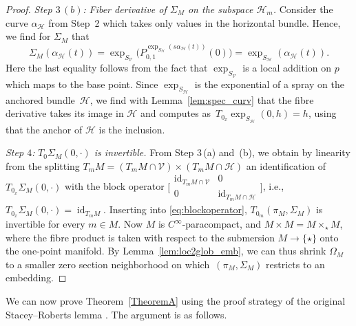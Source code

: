 \documentclass[pdftex]{sigma}
\numberwithin{equation}{section}
\newcommand{\cH}{\ensuremath{\mathcal{H}}}
\newcommand{\cV}{\ensuremath{\mathcal{V}}}
\DeclareMathOperator{\id}{id}
\begin{document}
\begin{proof}
{\it Step $3\,(b)$:} \emph{Fiber derivative of $\Sigma_M$ on the subspace $\cH_m$.} Consider the curve $\alpha_\cH$ from Step~2 which takes only values in the horizontal bundle. Hence, we find for $\Sigma_M$ that
\begin{displaymath}\Sigma_M (\alpha_{\cH}(t)) =\exp_{S_{\cV}}\bigl(P_{0,1}^{\exp_{S_\cH}(s\alpha_{\cH}(t))}(0)\bigr)=\exp_{S_\cH}(\alpha_\cH(t)).
\end{displaymath}
Here the last equality follows from the fact that $\exp_{S_{\cV}}$ is a local addition on $p$ which maps \smash{$0\raisebox{2pt}{${}_{\exp_{S_{\cH}}(\alpha_\cH(t))}$}$} to the base point. Since $\exp_{S_\cH}$ is the exponential of a spray on the anchored bundle~$\cH$, we find with Lemma~\ref{lem:spec_curv} that the fibre derivative takes its image in $\cH$ and computes as~$T_{0_x} \exp_{S_{\cH}}(0,h)=h$, using that the anchor of $\cH$ is the inclusion.

{\it Step $4$:} \emph{$T_0\Sigma_M(0,\cdot)$ is invertible.} From Step 3\,(a) and~(b), we obtain by linearity from the splitting $T_m M = (T_m M \cap \cV) \times (T_mM \cap \cH)$ an identification of $T_{0_x}\Sigma_M (0,\cdot )$ with the block operator
$\bigl[\begin{smallmatrix} \id_{T_m M \cap \cV} & 0 \\ 0 & \id_{T_mM \cap \cH}\end{smallmatrix}\bigr]$, i.e., $T_{0_x}\Sigma_M (0,\cdot ) = \id_{T_m M}$. Inserting into \eqref{eq:blockoperator}, $T_{0_m} (\pi_M,\Sigma_M)$ is invertible for every $m \in M$. Now $M$ is $C^\infty$-paracompact, and $M \times M = M \times_\star M$, where the fibre product is taken with respect to the submersion $M \rightarrow \{\star\}$ onto the one-point manifold. By Lemma~\ref{lem:loc2glob_emb}, we can thus shrink $\Omega_M$ to a smaller zero section neighborhood on which~$(\pi_M,\Sigma_M)$ restricts to an embedding.
\end{proof}

We can now prove Theorem~\ref{TheoremA} using the proof strategy of the original Stacey--Roberts lemma \cite[Lemma~2.4]{AaS19}. The argument is as follows.
\end{document}
